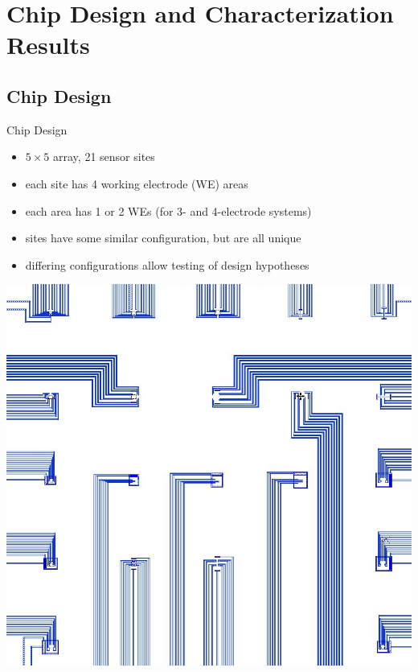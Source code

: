 \documentclass[10pt]{beamer}
\begin{document}
\section{Chip Design and Characterization Results}
\subsection{Chip Design}
\begin{frame}{Chip Design}
	\begin{itemize}
		\item $5 \times 5$ array, 21 sensor sites
		\item each site has 4 working electrode (WE) areas
		\item each area has 1 or 2 WEs (for 3- and 4-electrode systems)
		\item sites have some similar configuration, but are all unique
		\item differing configurations allow testing of design hypotheses
	\end{itemize}
	\includegraphics[width=0.5\linewidth]{figures/biosensorchip-sensors.png}
\end{frame}
\end{document}
